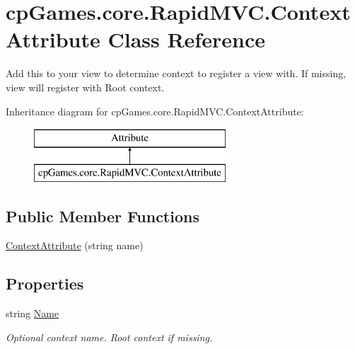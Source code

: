 \hypertarget{classcp_games_1_1core_1_1_rapid_m_v_c_1_1_context_attribute}{}\section{cp\+Games.\+core.\+Rapid\+M\+V\+C.\+Context\+Attribute Class Reference}
\label{classcp_games_1_1core_1_1_rapid_m_v_c_1_1_context_attribute}


Add this to your view to determine context to register a view with. If missing, view will register with Root context.  


Inheritance diagram for cp\+Games.\+core.\+Rapid\+M\+V\+C.\+Context\+Attribute\+:\begin{figure}[H]
\begin{center}
\leavevmode
\includegraphics[height=2.000000cm]{classcp_games_1_1core_1_1_rapid_m_v_c_1_1_context_attribute}
\end{center}
\end{figure}
\subsection*{Public Member Functions}
\begin{DoxyCompactItemize}
\item 
\mbox{\hyperlink{classcp_games_1_1core_1_1_rapid_m_v_c_1_1_context_attribute_a2f20f2c5247220479a0844d4931b6395}{Context\+Attribute}} (string name)
\end{DoxyCompactItemize}
\subsection*{Properties}
\begin{DoxyCompactItemize}
\item 
string \mbox{\hyperlink{classcp_games_1_1core_1_1_rapid_m_v_c_1_1_context_attribute_aeeb0490378fbdbaedbc5c3e0d5200c87}{Name}}
\begin{DoxyCompactList}\small\item\em Optional context name. Root context if missing. \end{DoxyCompactList}\end{DoxyCompactItemize}


